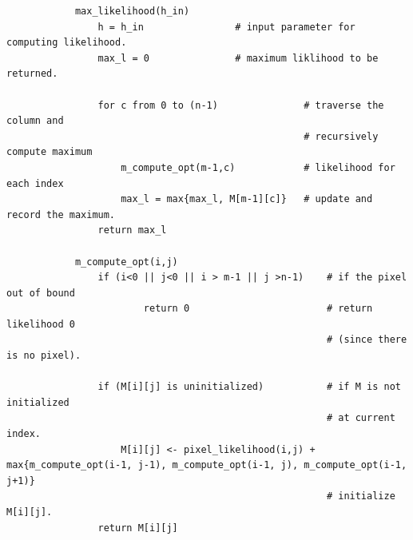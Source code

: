 \documentclass[10pt]{article}
\begin{document}
\begin{enumerate}
\begin{itemize}
\begin{mdframed}
\begin{lstlisting}
            max_likelihood(h_in)
                h = h_in                # input parameter for computing likelihood.
                max_l = 0               # maximum liklihood to be returned.
                
                for c from 0 to (n-1)               # traverse the column and 
                                                    # recursively compute maximum 
                    m_compute_opt(m-1,c)            # likelihood for each index
                    max_l = max{max_l, M[m-1][c]}   # update and record the maximum.
                return max_l
            
            m_compute_opt(i,j)
                if (i<0 || j<0 || i > m-1 || j >n-1)    # if the pixel out of bound
                        return 0                        # return likelihood 0
                                                        # (since there is no pixel).
                                                        
                if (M[i][j] is uninitialized)           # if M is not initialized 
                                                        # at current index.
                    M[i][j] <- pixel_likelihood(i,j) + max{m_compute_opt(i-1, j-1), m_compute_opt(i-1, j), m_compute_opt(i-1, j+1)}        
                                                        # initialize M[i][j].
                return M[i][j]
                

\end{lstlisting}
\end{mdframed}
\end{itemize}
\end{enumerate}
\end{document}
